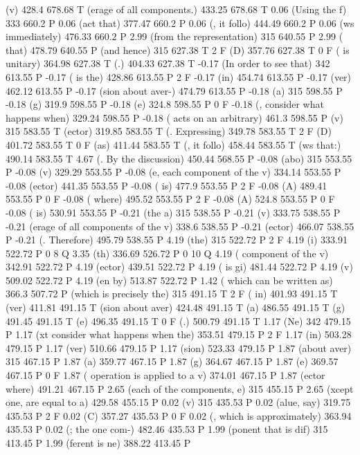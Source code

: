 (v) 428.4 678.68 T
(erage of all components.) 433.25 678.68 T
0.06 (Using the f) 333 660.2 P
0.06 (act that) 377.47 660.2 P
0.06 (, it follo) 444.49 660.2 P
0.06 (ws immediately) 476.33 660.2 P
2.99 (from the representation) 315 640.55 P
2.99 ( that) 478.79 640.55 P
(and hence) 315 627.38 T
2 F
(D) 357.76 627.38 T
0 F
( is unitary) 364.98 627.38 T
(.) 404.33 627.38 T
-0.17 (In order to see that) 342 613.55 P
-0.17 ( is the) 428.86 613.55 P
2 F
-0.17 (in) 454.74 613.55 P
-0.17 (ver) 462.12 613.55 P
-0.17 (sion about aver-) 474.79 613.55 P
-0.18 (a) 315 598.55 P
-0.18 (g) 319.9 598.55 P
-0.18 (e) 324.8 598.55 P
0 F
-0.18 (, consider what happens when) 329.24 598.55 P
-0.18 ( acts on an arbitrary) 461.3 598.55 P
(v) 315 583.55 T
(ector) 319.85 583.55 T
(. Expressing) 349.78 583.55 T
2 F
(D) 401.72 583.55 T
0 F
(as) 411.44 583.55 T
(, it follo) 458.44 583.55 T
(ws that:) 490.14 583.55 T
4.67 (. By the discussion) 450.44 568.55 P
-0.08 (abo) 315 553.55 P
-0.08 (v) 329.29 553.55 P
-0.08 (e, each component of the v) 334.14 553.55 P
-0.08 (ector) 441.35 553.55 P
-0.08 ( is) 477.9 553.55 P
2 F
-0.08 (A) 489.41 553.55 P
0 F
-0.08 ( where) 495.52 553.55 P
2 F
-0.08 (A) 524.8 553.55 P
0 F
-0.08 ( is) 530.91 553.55 P
-0.21 (the a) 315 538.55 P
-0.21 (v) 333.75 538.55 P
-0.21 (erage of all components of the v) 338.6 538.55 P
-0.21 (ector) 466.07 538.55 P
-0.21 (. Therefore) 495.79 538.55 P
4.19 (the) 315 522.72 P
2 F
4.19 (i) 333.91 522.72 P
0 8 Q
3.35 (th) 336.69 526.72 P
0 10 Q
4.19 ( component of the v) 342.91 522.72 P
4.19 (ector) 439.51 522.72 P
4.19 ( is gi) 481.44 522.72 P
4.19 (v) 509.02 522.72 P
4.19 (en by) 513.87 522.72 P
1.42 ( which can be written as) 366.3 507.72 P
(which is precisely the) 315 491.15 T
2 F
( in) 401.93 491.15 T
(ver) 411.81 491.15 T
(sion about aver) 424.48 491.15 T
(a) 486.55 491.15 T
(g) 491.45 491.15 T
(e) 496.35 491.15 T
0 F
(.) 500.79 491.15 T
1.17 (Ne) 342 479.15 P
1.17 (xt consider what happens when the) 353.51 479.15 P
2 F
1.17 (in) 503.28 479.15 P
1.17 (ver) 510.66 479.15 P
1.17 (sion) 523.33 479.15 P
1.87 (about aver) 315 467.15 P
1.87 (a) 359.77 467.15 P
1.87 (g) 364.67 467.15 P
1.87 (e) 369.57 467.15 P
0 F
1.87 ( operation is applied to a v) 374.01 467.15 P
1.87 (ector where) 491.21 467.15 P
2.65 (each of the components, e) 315 455.15 P
2.65 (xcept one, are equal to a) 429.58 455.15 P
0.02 (v) 315 435.53 P
0.02 (alue, say) 319.75 435.53 P
2 F
0.02 (C) 357.27 435.53 P
0 F
0.02 (, which is approximately) 363.94 435.53 P
0.02 (; the one com-) 482.46 435.53 P
1.99 (ponent that is dif) 315 413.45 P
1.99 (ferent is ne) 388.22 413.45 P
